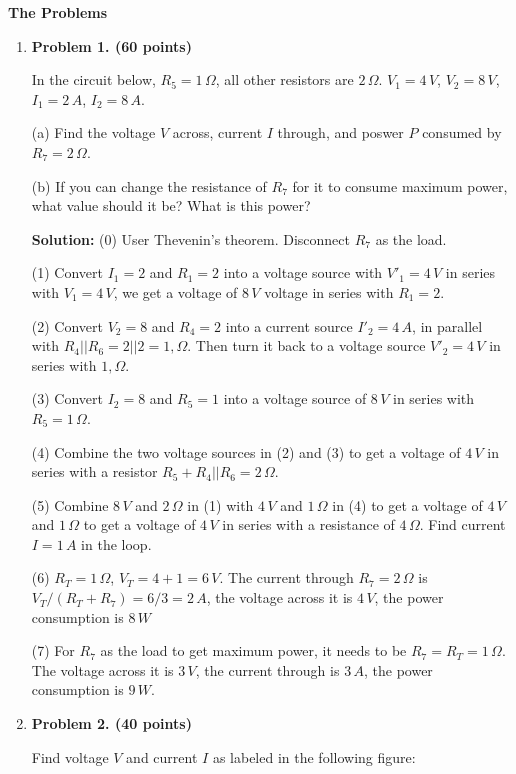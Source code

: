 {\bf The Problems}
\begin{enumerate}


\item {\bf Problem 1. (60 points)} 
  
  In the circuit below, $R_5=1\,\Omega$, all other resistors are
  $2\,\Omega$. $V_1=4\,V$, $V_2=8\,V$, $I_1=2\,A$, $I_2=8\,A$.

  (a) Find the voltage $V$ across, current $I$ through, and poswer
  $P$ consumed by $R_7=2\,\Omega$.
  

  (b) If you can change the resistance of $R_7$ for it to consume
  maximum power, what value should it be? What is this power?


  {\bf Solution:} 
  (0) User Thevenin's theorem. Disconnect $R_7$ as the load.

  (1) Convert $I_1=2$ and $R_1=2$ into a voltage source with $V'_1=4\,V$
  in series with $V_1=4\,V$, we get a voltage of $8\,V$ voltage in series 
  with $R_1=2$. 
  
  (2) Convert $V_2=8$ and $R_4=2$ into a current source $I'_2=4\,A$, in 
  parallel with $R_4||R_6=2||2=1,\Omega$. Then turn it back to a voltage 
  source $V'_2=4\,V$ in series with $1,\Omega$. 

  (3) Convert $I_2=8$ and $R_5=1$ into a voltage source of $8\,V$ in series
  with $R_5=1\,\Omega$.

  (4) Combine the two voltage sources in (2) and (3) to get a voltage of 
  $4\,V$ in series with a resistor $R_5+R_4||R_6=2\,\Omega$.

  (5) Combine $8\,V$ and $2\,\Omega$ in (1) with $4\,V$ and $1\,\Omega$ 
  in (4) to get a voltage of $4\,V$ and $1\,\Omega$ to get a voltage of 
  $4\,V$ in series with a resistance of $4\,\Omega$. Find current $I=1\,A$
  in the loop.

  (6) $R_T=1\,\Omega$, $V_T=4+1=6\,V$. The current through $R_7=2\,\Omega$
  is $V_T/(R_T+R_7)=6/3=2\,A$, the voltage across it is $4\,V$, the power
  consumption is $8\,W$

  (7) For $R_7$ as the load to get maximum power, it needs to be 
  $R_7=R_T=1\,\Omega$. The voltage across it is $3\,V$, the current 
  through is $3\,A$, the power consumption is $9\,W$.

\item {\bf Problem 2. (40 points)}

  Find voltage $V$ and current $I$ as labeled in the following figure:


\end{enumerate}
